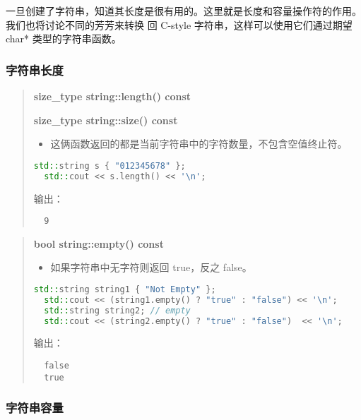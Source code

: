 \documentclass[../../LearnCpp.tex]{subfiles}
\begin{document}

一旦创建了字符串，知道其长度是很有用的。这里就是长度和容量操作符的作用。
我们也将讨论不同的芳芳来转换  回 C-style 字符串，这样可以使用它们通过期望 char* 类型的字符串函数。

\subsubsection*{字符串长度}

\begin{quotation}
  \textbf{size\_type string::length() const}

  \textbf{size\_type string::size() const}

  \begin{itemize}
    \item 这俩函数返回的都是当前字符串中的字符数量，不包含空值终止符。
  \end{itemize}

  \begin{lstlisting}[language=C++]
  std::string s { "012345678" };
  std::cout << s.length() << '\n';
  \end{lstlisting}

  输出：

  \begin{lstlisting}
  9
  \end{lstlisting}
\end{quotation}

\begin{quotation}
  \textbf{bool string::empty() const}

  \begin{itemize}
    \item 如果字符串中无字符则返回 true，反之 false。
  \end{itemize}

  \begin{lstlisting}[language=C++]
  std::string string1 { "Not Empty" };
  std::cout << (string1.empty() ? "true" : "false") << '\n';
  std::string string2; // empty
  std::cout << (string2.empty() ? "true" : "false")  << '\n';
  \end{lstlisting}

  输出：

  \begin{lstlisting}
  false
  true
  \end{lstlisting}
\end{quotation}

\subsubsection*{字符串容量}
\end{document}
